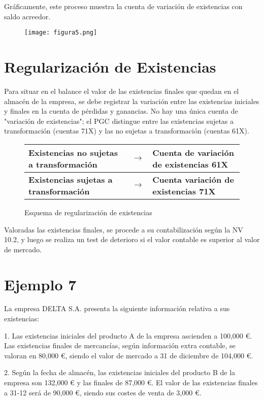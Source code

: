 \documentclass{article}
\begin{document}
Gráficamente, este proceso muestra la cuenta de variación de existencias con saldo acreedor.

\begin{figure}[H]
    \centering
    \texttt{[image: figura5.png]}
\end{figure}

\section*{Regularización de Existencias}

Para situar en el balance el valor de las existencias finales que quedan en el almacén de la empresa, se debe registrar la variación entre las existencias iniciales y finales en la cuenta de pérdidas y ganancias. No hay una única cuenta de "variación de existencias"; el PGC distingue entre las existencias sujetas a transformación (cuentas 71X) y las no sujetas a transformación (cuentas 61X).

\begin{figure}[h]
\centering
\begin{tabular}{|p{4cm}|p{4cm}|p{4cm}|}
\hline
\textbf{Existencias no sujetas a transformación} & $\rightarrow$ & \textbf{Cuenta de variación de existencias 61X} \\
\hline
\textbf{Existencias sujetas a transformación} & $\rightarrow$ & \textbf{Cuenta variación de existencias 71X} \\
\hline
\end{tabular}
\caption{Esquema de regularización de existencias}
\end{figure}

Valoradas las existencias finales, se procede a su contabilización según la NV 10.2, y luego se realiza un test de deterioro si el valor contable es superior al valor de mercado.

\section*{Ejemplo 7}

La empresa DELTA S.A. presenta la siguiente información relativa a sus existencias:

1. Las existencias iniciales del producto A de la empresa ascienden a 100,000 €. Las existencias finales de mercancías, según información extra contable, se valoran en 80,000 €, siendo el valor de mercado a 31 de diciembre de 104,000 €.

2. Según la fecha de almacén, las existencias iniciales del producto B de la empresa son 132,000 € y las finales de 87,000 €. El valor de las existencias finales a 31-12 será de 90,000 €, siendo sus costes de venta de 3,000 €.
\end{document}
